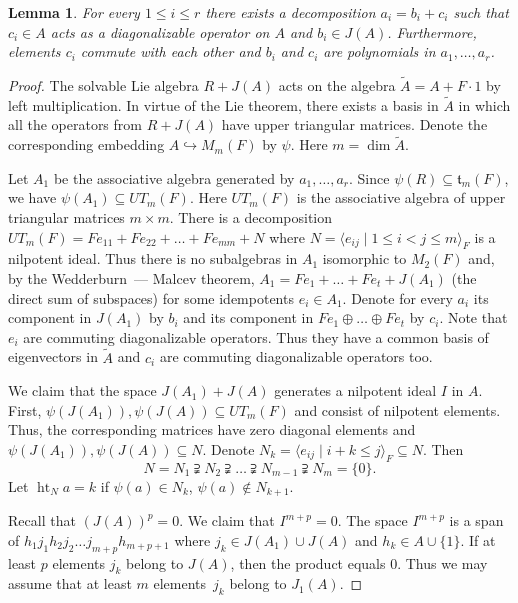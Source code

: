 \documentclass[12pt, reqno, a4paper]{amsart}
\theoremstyle{plain}
\newtheorem{lemma}{Lemma}
\theoremstyle{remark}
\theoremstyle{definition}
\begin{document}
\begin{lemma}\label{LemmaJordanDecomp}
For every $1 \leqslant i \leqslant r$ there exists a decomposition $a_i = b_i + c_i$
such that $c_i \in A$ acts as a diagonalizable operator on $A$ and $b_i \in J(A)$.
Furthermore, elements $c_i$ commute with each other
 and $b_i$ and $c_i$ are polynomials in $a_1, \ldots, a_r$.
\end{lemma}
\begin{proof}
The solvable Lie algebra $R+J(A)$ acts on the algebra $\tilde A=A+F\cdot 1$
by left multiplication. In virtue of the Lie theorem, there exists
 a basis in $\tilde A$ in which all the operators from $R+J(A)$ have
 upper triangular matrices. Denote the corresponding
 embedding $A  \hookrightarrow M_m(F)$ by $\psi$.
 Here $m = \dim \tilde A$.

Let $A_1$ be the associative algebra generated by $a_1, \ldots, a_r$.
Since $\psi(R) \subseteq \mathfrak{t}_m(F)$, we have
$\psi(A_1) \subseteq UT_m(F)$. Here $UT_m(F)$ is the associative algebra
 of upper triangular matrices $m\times m$.
 There is a decomposition $UT_m(F) = Fe_{11}+Fe_{22}+\dots+Fe_{mm}+N$
 where $N = \langle e_{ij} \mid 1 \leqslant i < j \leqslant m \rangle_F$
 is a nilpotent ideal. Thus there is no subalgebras in $A_1$
 isomorphic to $M_2(F)$ and, by the Wedderburn~--- Malcev theorem,
 $A_1 = Fe_1 + \dots + Fe_t + J(A_1)$
 (the direct sum of subspaces) for some idempotents $e_i \in A_1$.
Denote for every $a_i$  its component in $J(A_1)$ by $b_i$
and its component in $Fe_1 \oplus \dots \oplus Fe_t$ by $c_i$.
Note that $e_i$ are commuting diagonalizable operators. Thus they
have a common basis of eigenvectors in $\tilde A$ and $c_i$
are commuting diagonalizable operators too.

We claim that the space $J(A_1)+J(A)$ generates a nilpotent ideal $I$ in $A$.
First, $\psi(J(A_1)), \psi(J(A)) \subseteq UT_m(F)$
and consist of nilpotent elements. Thus, the corresponding
matrices have zero diagonal elements and
$\psi(J(A_1)), \psi(J(A)) \subseteq N$.
Denote $N_k = \langle e_{ij} \mid i+k \leqslant j \rangle_F \subseteq N$.
Then $$N = N_1 \supsetneqq N_2 \supsetneqq \ldots \supsetneqq N_{m-1} \supsetneqq N_m = \lbrace 0\rbrace.$$
Let $\operatorname{ht}_N a = k$ if $\psi(a) \in N_k$, $\psi(a) \notin N_{k+1}$.

Recall that $(J(A))^p =0$.
We claim that $I^{m+p} = 0$.
 The space $I^{m+p}$
 is a span of $h_1 j_1 h_2 j_2 \ldots j_{m+p} h_{m+p+1}$
 where $j_k \in J(A_1) \cup J(A)$ and $h_k \in A \cup \lbrace 1\rbrace$.
 If at least $p$ elements $j_k$ belong to $J(A)$,
 then the product equals $0$. Thus we may assume that at least
 $m$ elements~$j_k$ belong to $J_1(A)$.


\end{proof}
\end{document}
